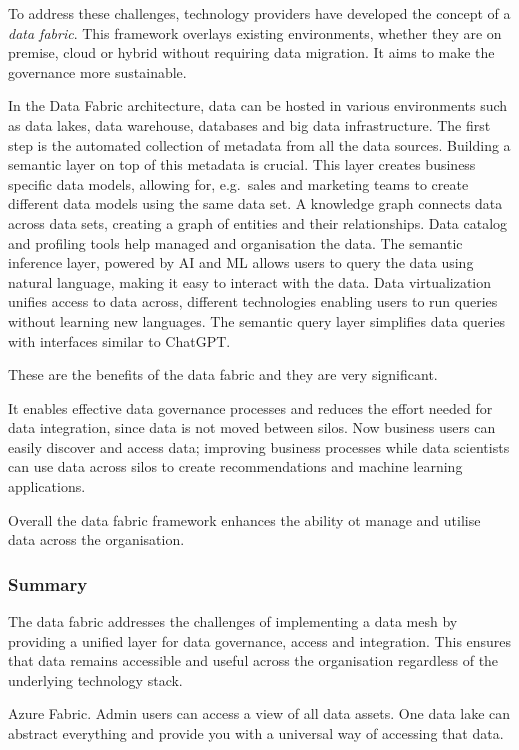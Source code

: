 \documentclass[a4paper, 11pt]{book}
\begin{document}
    To address these challenges, technology providers have developed the concept of a \textit{data fabric}.
    This framework overlays existing environments, whether they are on premise, cloud or hybrid without requiring data migration.
    It aims to make the governance more sustainable.

    In the Data Fabric architecture, data can be hosted in various environments such as data lakes, data warehouse, databases and big data infrastructure.
    The first step is the automated collection of metadata from all the data sources.
    Building a semantic layer on top of this metadata is crucial.
    This layer creates business specific data models, allowing for, e.g.\ sales and marketing teams to create different data models using the same data set.
    A knowledge graph connects data across data sets, creating a graph of entities and their relationships.
    Data catalog and profiling tools help managed and organisation the data.
    The semantic inference layer, powered by AI and ML allows users to query the data using natural language, making it easy to interact with the data.
    Data virtualization unifies access to data across, different technologies enabling users to run queries without learning new languages.
    The semantic query layer simplifies data queries with interfaces similar to ChatGPT\@.

    These are the benefits of the data fabric and they are very significant.

    It enables effective data governance processes and reduces the effort needed for data integration, since data is not moved between silos.
    Now business users can easily discover and access data; improving business processes while data scientists can use data across silos to create recommendations and machine learning applications.

    Overall the data fabric framework enhances the ability ot manage and utilise data across the organisation.

    \subsubsection{Summary}
    The data fabric addresses the challenges of implementing a data mesh by providing a unified layer for data governance, access and integration.
    This ensures that data remains accessible and useful across the organisation regardless of the underlying technology stack.

    Azure Fabric.
    Admin users can access a view of all data assets.
    One data lake can abstract everything and provide you with a universal way of accessing that data.
\end{document}
